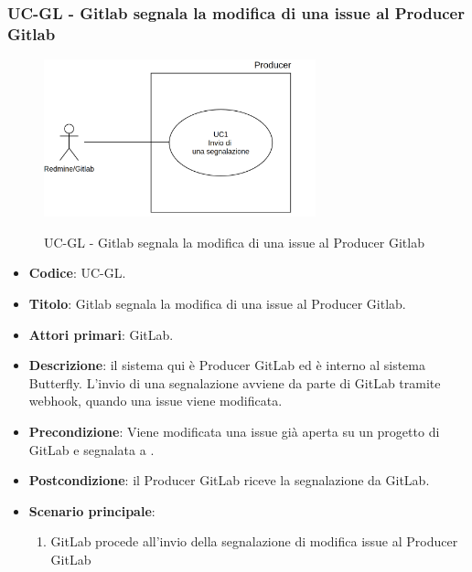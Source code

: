 	\subsubsection{UC\theuccount-GL - Gitlab segnala la modifica di una issue al Producer Gitlab}
	\begin{figure}[H]
		\centering
		\includegraphics[width=0.7\textwidth]{img/UC1.png}\\
		\caption{UC\theuccount-GL - Gitlab segnala la modifica di una issue al Producer Gitlab}
	\end{figure}
	\begin{itemize}
		\item \textbf{Codice}: UC\theuccount-GL.
		\item \textbf{Titolo}: Gitlab segnala la modifica di una issue al Producer Gitlab.
		\item \textbf{Attori primari}: GitLab.
		\item \textbf{Descrizione}: il sistema qui è Producer GitLab ed è interno al sistema Butterfly. L'invio di una segnalazione avviene
		da parte di GitLab tramite webhook, quando una issue viene modificata.
		\item \textbf{Precondizione}: Viene modificata una issue già aperta su un
		progetto di GitLab e segnalata a \progetto.
		\item \textbf{Postcondizione}: il Producer GitLab riceve la segnalazione da GitLab.
		\item \textbf{Scenario principale}: 
		\begin{enumerate}
			\item GitLab procede all'invio della segnalazione di modifica issue al Producer GitLab
		\end{enumerate}
		
	\end{itemize}